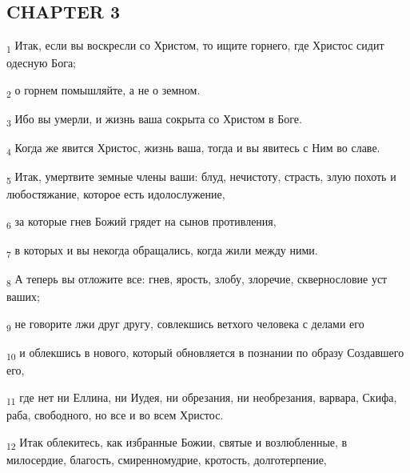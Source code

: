 \subsection{CHAPTER 3}
\begin{tcolorbox}
\textsubscript{1} Итак, если вы воскресли со Христом, то ищите горнего, где Христос сидит одесную Бога;
\end{tcolorbox}
\begin{tcolorbox}
\textsubscript{2} о горнем помышляйте, а не о земном.
\end{tcolorbox}
\begin{tcolorbox}
\textsubscript{3} Ибо вы умерли, и жизнь ваша сокрыта со Христом в Боге.
\end{tcolorbox}
\begin{tcolorbox}
\textsubscript{4} Когда же явится Христос, жизнь ваша, тогда и вы явитесь с Ним во славе.
\end{tcolorbox}
\begin{tcolorbox}
\textsubscript{5} Итак, умертвите земные члены ваши: блуд, нечистоту, страсть, злую похоть и любостяжание, которое есть идолослужение,
\end{tcolorbox}
\begin{tcolorbox}
\textsubscript{6} за которые гнев Божий грядет на сынов противления,
\end{tcolorbox}
\begin{tcolorbox}
\textsubscript{7} в которых и вы некогда обращались, когда жили между ними.
\end{tcolorbox}
\begin{tcolorbox}
\textsubscript{8} А теперь вы отложите все: гнев, ярость, злобу, злоречие, сквернословие уст ваших;
\end{tcolorbox}
\begin{tcolorbox}
\textsubscript{9} не говорите лжи друг другу, совлекшись ветхого человека с делами его
\end{tcolorbox}
\begin{tcolorbox}
\textsubscript{10} и облекшись в нового, который обновляется в познании по образу Создавшего его,
\end{tcolorbox}
\begin{tcolorbox}
\textsubscript{11} где нет ни Еллина, ни Иудея, ни обрезания, ни необрезания, варвара, Скифа, раба, свободного, но все и во всем Христос.
\end{tcolorbox}
\begin{tcolorbox}
\textsubscript{12} Итак облекитесь, как избранные Божии, святые и возлюбленные, в милосердие, благость, смиренномудрие, кротость, долготерпение,
\end{tcolorbox}
